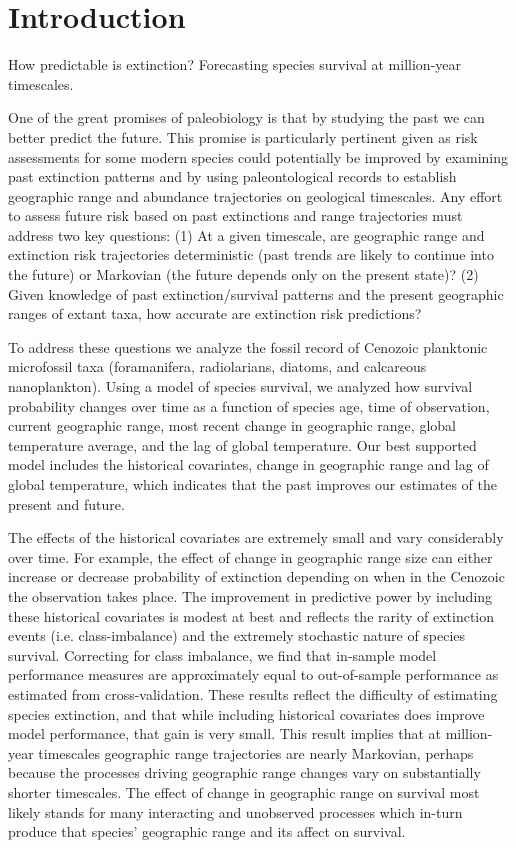 \documentclass[12pt,letterpaper]{article}
\begin{document}
\section{Introduction}

How predictable is extinction? Forecasting species survival at million-year timescales.

One of the great promises of paleobiology is that by studying the past we can better predict the future.  This promise is particularly pertinent given as risk assessments for some modern species could potentially be improved by examining past extinction patterns and by using paleontological records to establish geographic range and abundance trajectories on geological timescales.  Any effort to assess future risk based on past extinctions and range trajectories must address two key questions:  (1) At a given timescale, are geographic range and extinction risk trajectories deterministic (past trends are likely to continue into the future) or Markovian (the future depends only on the present state)? (2) Given knowledge of past extinction/survival patterns and the present geographic ranges of extant taxa, how accurate are extinction risk predictions?  

To address these questions we analyze the fossil record of Cenozoic planktonic microfossil taxa (foramanifera, radiolarians, diatoms, and calcareous nanoplankton). Using a model of species survival, we analyzed how survival probability changes over time as a function of species age, time of observation, current geographic range, most recent change in geographic range, global temperature average, and the lag of global temperature. Our best supported model includes the historical covariates, change in geographic range and lag of global temperature, which indicates that the past improves our estimates of the present and future. 

The effects of the historical covariates are extremely small and vary considerably over time. For example, the effect of change in geographic range size can either increase or decrease probability of extinction depending on when in the Cenozoic the observation takes place. The improvement in predictive power by including these historical covariates is modest at best and reflects the rarity of extinction events (i.e. class-imbalance) and the extremely stochastic nature of species survival. Correcting for class imbalance, we find that in-sample model performance measures are approximately equal to out-of-sample performance as estimated from cross-validation. These results reflect the difficulty of estimating species extinction, and that while including historical covariates does improve model performance, that gain is very small.  This result implies that at million-year timescales geographic range trajectories are nearly Markovian, perhaps because the processes driving geographic range changes vary on substantially shorter timescales. The effect of change in geographic range on survival most likely stands for many interacting and unobserved processes which in-turn produce that species' geographic range and its affect on survival. 
\end{document}
